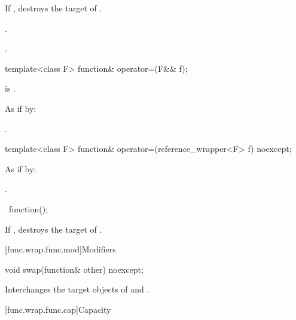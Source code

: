 \begin{itemdescr}
\pnum
\effects
If , destroys the target of .

\pnum
\ensures
{}.

\pnum
\returns
{}.
\end{itemdescr}

%
\begin{itemdecl}
template<class F> function& operator=(F&& f);
\end{itemdecl}

\begin{itemdescr}
\pnum
\constraints
{} is .

\pnum
\effects
As if by: 

\pnum
\returns
{}.
\end{itemdescr}

%
\begin{itemdecl}
template<class F> function& operator=(reference_wrapper<F> f) noexcept;
\end{itemdecl}

\begin{itemdescr}
\pnum
\effects
As if by: 

\pnum
\returns
{}.
\end{itemdescr}

%
\begin{itemdecl}
~function();
\end{itemdecl}

\begin{itemdescr}
\pnum
\effects
If , destroys the target of .
\end{itemdescr}

[func.wrap.func.mod]{Modifiers}

%
\begin{itemdecl}
void swap(function& other) noexcept;
\end{itemdecl}

\begin{itemdescr}
\pnum
\effects
Interchanges the target objects of  and .
\end{itemdescr}

[func.wrap.func.cap]{Capacity}

